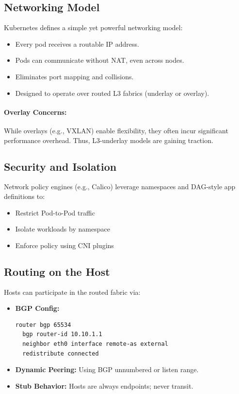 \subsection*{Networking Model}

Kubernetes defines a simple yet powerful networking model:

\begin{itemize}
  \item Every pod receives a routable IP address.
  \item Pods can communicate without NAT, even across nodes.
  \item Eliminates port mapping and collisions.
  \item Designed to operate over routed L3 fabrics (underlay or overlay).
\end{itemize}

\paragraph{Overlay Concerns:} While overlays (e.g., VXLAN) enable flexibility, they often incur significant performance overhead. Thus, L3-underlay models are gaining traction.

\subsection{Security and Isolation}

Network policy engines (e.g., Calico) leverage namespaces and DAG-style app definitions to:

\begin{itemize}
  \item Restrict Pod-to-Pod traffic
  \item Isolate workloads by namespace
  \item Enforce policy using CNI plugins
\end{itemize}

\subsection{Routing on the Host}

Hosts can participate in the routed fabric via:

\begin{itemize}
  \item \textbf{BGP Config:}
\begin{verbatim}
router bgp 65534
  bgp router-id 10.10.1.1
  neighbor eth0 interface remote-as external
  redistribute connected
\end{verbatim}
  \item \textbf{Dynamic Peering:} Using BGP unnumbered or listen range.
  \item \textbf{Stub Behavior:} Hosts are always endpoints; never transit.
\end{itemize}

